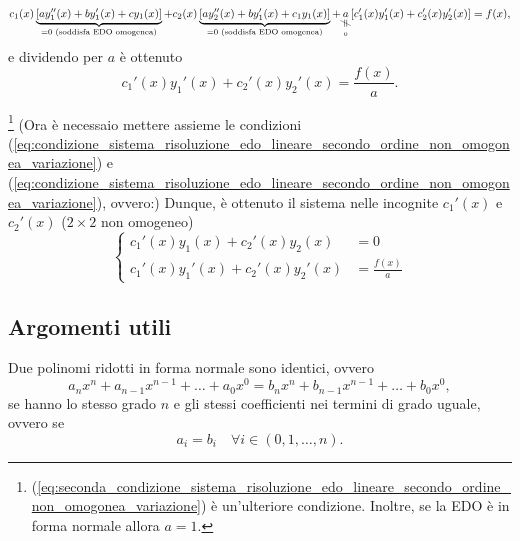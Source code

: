 \begin{equation*}
	c_1(x)\underbrace{[ay_1''(x) + b y_1'(x) + c y_1(x)]}_{ = 0\text{ (soddisfa EDO omogenea)}} + c_2(x) \underbrace{[ay_2''(x) + b y_1'(x) + c_1 y_1(x)]}_{ = 0\text{ (soddisfa EDO omogenea)}} + \underset{\underset{0}{\vertneq}}{a} [c_1'(x) y_1'(x) + c_2'(x)y_2'(x)] = f(x),
\end{equation*}
e dividendo per $a$ è ottenuto
\begin{equation}\label{eq:seconda_condizione_sistema_risoluzione_edo_lineare_secondo_ordine_non_omogonea_variazione}
	c_1'(x) y_1'(x) + c_2'(x) y_2'(x) = \frac{f(x)}{a}.
\end{equation}


\noindent \footnote{(\ref{eq:seconda_condizione_sistema_risoluzione_edo_lineare_secondo_ordine_non_omogonea_variazione}) è un'ulteriore condizione. Inoltre, se la EDO è in forma normale allora $a=1$.} (Ora è necessaio mettere assieme le condizioni (\ref{eq:condizione_sistema_risoluzione_edo_lineare_secondo_ordine_non_omogonea_variazione}) e (\ref{eq:condizione_sistema_risoluzione_edo_lineare_secondo_ordine_non_omogonea_variazione}), ovvero:) Dunque, è ottenuto il sistema nelle incognite $c_1'(x)$ e $c_2'(x)$ ($2\times 2$ non omogeneo)
\begin{equation}
	\begin{cases}
		c_1'(x) y_1(x) + c_2'(x) y_2(x) &= 0\\
		c_1'(x) y_1'(x) + c_2'(x) y_2'(x) &= \frac{f(x)}{a}
	\end{cases}
\end{equation}


\subsection{Argomenti utili}
\begin{theorem}\label{th:principio_identità_polinomi}
		Due polinomi ridotti in forma normale sono identici, ovvero
		\begin{equation*}
			a_nx^n+a_{n-1}x^{n-1}+\hdots+a_0x^0 = b_nx^n+b_{n-1}x^{n-1}+\hdots+b_0x^0,
		\end{equation*}
		se hanno lo stesso grado $n$ e gli stessi coefficienti nei termini di grado uguale, ovvero se
		\begin{equation*}
			a_i=b_i\quad\forall i\in(0,1,\hdots, n).
		\end{equation*}
\end{theorem}
